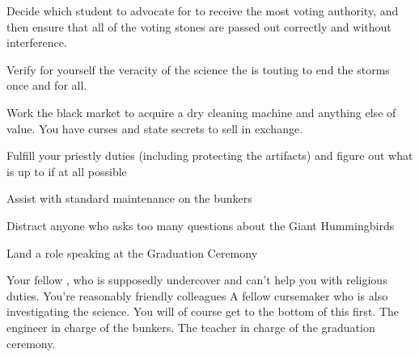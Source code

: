 \documentclass[char]{GL2020}
\begin{document}
\begin{itemz}[Goals]
	\item Decide which \pFarm{} student to advocate for to receive the most voting authority, and then ensure that all of the voting stones are passed out correctly and without interference.
	\item Verify for yourself the veracity of the science the \pTech{} is touting to end the storms once and for all.
	\item Work the black market to acquire a dry cleaning machine and anything else of value. You have curses and state secrets to sell in exchange.
	\item Fulfill your priestly duties (including protecting the artifacts) and figure out what \cInterpol{} is up to if at all possible
	\item Assist \cBunker{} with standard maintenance on the bunkers
	\item Distract anyone who asks too many questions about the Giant Hummingbirds
	\item Land a role speaking at the Graduation Ceremony
\end{itemz}

\begin{itemz}[Notes]
	\item 
\end{itemz}

\begin{contacts}
	\contact{\cInterpol{}} Your fellow \cInterpol{\cleric}, who is supposedly undercover and can’t help you with religious duties. You’re reasonably friendly colleagues
	\contact{\cCurse{}} A fellow cursemaker who is also investigating the \pTech{} science. You will of course get to the bottom of this first.
	\contact{\cBunker{}} The \pShip{} engineer in charge of the bunkers.
	\contact{\cMusic{}} The teacher in charge of the graduation ceremony.
\end{contacts}
\end{document}

